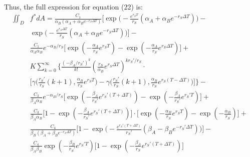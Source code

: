 \documentclass{article}
\begin{document}
Thus, the full expression for equation (22) is:
\begin{equation}
\begin{split}
\iint_D & f^*dA = \frac{C_1}{\alpha_B(\alpha_A + \alpha_B e^{-r_S \Delta T})} \Big[\exp\Big(-\frac{e^{r_S T}}{r_S} (\alpha_A + \alpha_B e^{-r_S \Delta T})\Big) - \\
& \exp\Big(-\frac{e^{r_S \Delta T}}{r_S} (\alpha_A + \alpha_B e^{-r_S \Delta T})\Big)\Big] - \\
&\frac{C_1}{\alpha_A \alpha_B} e^{-\alpha_B/r_S} \Big[\exp(-\frac{\alpha_A}{r_S} e^{r_S T}) - \exp(-\frac{\alpha_A}{r_S} e^{r_S \Delta T})\Big] + \\
& K \sum_{k=0}^{\infty} \Bigg\{\frac{(-\beta_A/r_S')^k}{k!} (\frac{r_S}{\alpha_B}e^{r_S \Delta T})^{k r_S'/r_S} \cdot \\
& \Big[\gamma\big(\frac{r_S'}{r_S}(k+1),\frac{\alpha_B}{r_S} e^{r_S T}\big) - \gamma\big(\frac{r_S'}{r_S}(k+1),\frac{\alpha_B}{r_S} e^{r_S (T-\Delta T)}\big)\Big]\Bigg\} - \\
& \frac{C_3}{\beta_A \alpha_B} e^{-\alpha_B/r_S} \Big[\exp(-\frac{\beta_A}{r_S'} e^{r_S' (T + \Delta T)}) - \exp( -\frac{\beta_A}{r_S'} e^{r_S' T})\Big] + \\
& \frac{C_3}{\beta_A \alpha_B} \Big[1-\exp(-\frac{\beta_A}{r_S'} e^{r_S' (T+\Delta T)})\Big]\cdot \Big[\exp(-\frac{\alpha_B}{r_S} e^{r_S T}) - \exp(-\frac{\alpha_B}{r_S})\Big] + \\
& \frac{C_4}{\beta_B(\beta_A + \beta_B e^{-r_S \Delta T})}\Big[1 - \exp\Big(-\frac{e^{r_S' (T+\Delta T)}}{r_S'} (\beta_A - \beta_B e^{-r_S' \Delta T}) \Big)\Big]- \\
& \frac{C_4}{\beta_A \beta_B} \exp(-\frac{\beta_B}{r_S'} e^{r_S' T}) \Big[1 - \exp(-\frac{\beta_A}{r_S} e^{r_S' (T+\Delta T)})\Big]
\end{split}
\end{equation}
\end{document}
